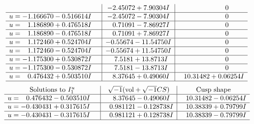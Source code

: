 \documentclass[1p]{elsarticle_modified}
\theoremstyle{definition}
\newcommand{\I}{\sqrt{-1}}
\begin{document}
$$\begin{array}{c|c|c}
 & -2.45072 + 7.90304 I & \phantom{-0.000000 } 0 \\ \hline\begin{aligned}
u &= -1.166670 - 0.516614 I\end{aligned}
 & -2.45072 - 7.90304 I & \phantom{-0.000000 } 0 \\ \hline\begin{aligned}
u &= \phantom{-}1.186890 + 0.476518 I\end{aligned}
 & \phantom{-}0.71091 - 7.86927 I & \phantom{-0.000000 } 0 \\ \hline\begin{aligned}
u &= \phantom{-}1.186890 - 0.476518 I\end{aligned}
 & \phantom{-}0.71091 + 7.86927 I & \phantom{-0.000000 } 0 \\ \hline\begin{aligned}
u &= \phantom{-}1.172460 + 0.524704 I\end{aligned}
 & -0.55674 - 11.54750 I & \phantom{-0.000000 } 0 \\ \hline\begin{aligned}
u &= \phantom{-}1.172460 - 0.524704 I\end{aligned}
 & -0.55674 + 11.54750 I & \phantom{-0.000000 } 0 \\ \hline\begin{aligned}
u &= -1.175300 + 0.530872 I\end{aligned}
 & \phantom{-}7.5181 + 13.8713 I & \phantom{-0.000000 } 0 \\ \hline\begin{aligned}
u &= -1.175300 - 0.530872 I\end{aligned}
 & \phantom{-}7.5181 - 13.8713 I & \phantom{-0.000000 } 0 \\ \hline\begin{aligned}
u &= \phantom{-}0.476432 + 0.503510 I\end{aligned}
 & \phantom{-}8.37645 + 0.49060 I & \phantom{-}10.31482 + 0.06254 I\\
 \hline 
 \end{array}$$\newpage$$\begin{array}{c|c|c}  
\text{Solutions to }I^u_{1}& \I (\text{vol} + \sqrt{-1}CS) & \text{Cusp shape}\\
 \hline 
\begin{aligned}
u &= \phantom{-}0.476432 - 0.503510 I\end{aligned}
 & \phantom{-}8.37645 - 0.49060 I & \phantom{-}10.31482 - 0.06254 I \\ \hline\begin{aligned}
u &= -0.430431 + 0.317615 I\end{aligned}
 & \phantom{-}0.981121 - 0.128738 I & \phantom{-}10.38339 + 0.79799 I \\ \hline\begin{aligned}
u &= -0.430431 - 0.317615 I\end{aligned}
 & \phantom{-}0.981121 + 0.128738 I & \phantom{-}10.38339 - 0.79799 I\\
 \hline 
 \end{array}$$\newpage
\end{document}
